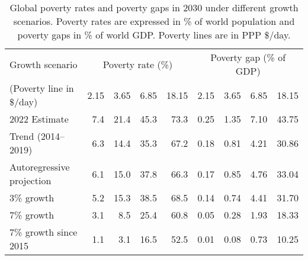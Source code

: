 \begin{table}[h]

\caption{\label{tab:poverty}Global poverty rates and poverty gaps in 2030 under different growth scenarios. Poverty rates are expressed in \% of world population and poverty gaps in \% of world GDP. Poverty lines are in PPP \$/day.}
\centering
\begin{tabular}[t]{lrrrrrrrr}
\toprule Growth scenario & \multicolumn{4}{c}{Poverty rate (\%)} & \multicolumn{4}{c}{Poverty gap (\% of GDP)} \\ 
 (Poverty line in \$/day)  & 2.15 & 3.65 & 6.85 & 18.15 & 2.15 & 3.65 & 6.85 & 18.15\\
\midrule
2022 Estimate & 7.4 & 21.4 & 45.3 & 73.3 & 0.25 & 1.35 & 7.10 & 43.75\\
Trend (2014--2019) & 6.3 & 14.4 & 35.3 & 67.2 & 0.18 & 0.81 & 4.21 & 30.86\\
Autoregressive projection & 6.1 & 15.0 & 37.8 & 66.3 & 0.17 & 0.85 & 4.76 & 33.04\\
3\% growth & 5.2 & 15.3 & 38.5 & 68.5 & 0.14 & 0.74 & 4.41 & 31.70\\
7\% growth & 3.1 & 8.5 & 25.4 & 60.8 & 0.05 & 0.28 & 1.93 & 18.33\\
7\% growth since 2015 & 1.1 & 3.1 & 16.5 & 52.5 & 0.01 & 0.08 & 0.73 & 10.25\\
\bottomrule
\end{tabular}
\end{table}